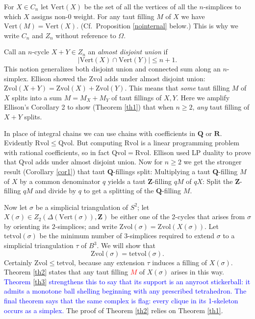 \documentclass[12pt]{article}
\def\ZZ{\mathbf{Z}}
\def\QQ{\mathbf{Q}}
\def\RR{\mathbf{R}}
\newcommand{\kw}{\mathrm}
\newcommand{\vertices}{\kw{Vert}}
\newcommand{\Zvol}{\kw{Zvol}}
\newcommand{\Qvol}{\kw{Qvol}}
\newcommand{\Rvol}{\kw{Rvol}}
\newcommand{\tetvol}{\kw{tetvol}}
\begin{document}
For $X \in C_n$ let
$\vertices(X)$ be the set of all the vertices of all the $n$-simplices
to which $X$ assigns non-$0$ weight.
For any taut filling $M$ of $X$ we have $\vertices(M) = \vertices(X)$.
(Cf.\ Proposition \ref{nointernal} below.)
This is why we write $C_n$ and $Z_n$ without reference to $\Omega$.

Call an $n$-cycle $X+Y \in Z_n$ an \emph{almost disjoint union} if
\[
|\vertices(X) \cap \vertices(Y)| \leq n+1
.
\]
This notion generalizes both disjoint union and connected sum
along an $n$-simplex.
Ellison \cite{ellison:gap}
showed the $\Zvol$ adds under almost disjoint union:
$\Zvol(X+Y) = \Zvol(X) + \Zvol(Y)$.
This means that \emph{some} taut filling $M$ of $X$ splits into a sum
$M=M_X+M_Y$ of taut fillings of $X,Y$.
Here we amplify Ellison's Corollary 2 to show (Theorem \ref{th1})
that when $n \geq 2$, \emph{any} taut filling of $X+Y$ splits.

In place of integral chains we can use chains with
coefficients in $\QQ$ or $\RR$.
Evidently $\Rvol \leq \Qvol$.
But computing $\Rvol$ is
a linear programming problem with rational coefficients,
so in fact $\Qvol = \Rvol$.
Ellison used LP duality to prove that
$\Qvol$ adds under almost
disjoint union.
Now for $n \geq 2$ we get the stronger result
(Corollary \ref{cor1})
that taut $\QQ$-fillings split:
Multiplying a taut
$\QQ$-filling $M$ of $X$ by a common denominator $q$
yields a taut $\ZZ$-filling $qM$ of $qX$:
Split the $\ZZ$-filling $qM$ and divide by $q$ to get a splitting
of the $\QQ$-filling $M$.

Now let $\sigma$ be a simplicial triangulation of $S^2$;
let $X(\sigma) \in Z_2(\Delta(\vertices(\sigma)),\ZZ)$
be either one of the 2-cycles
that arises from $\sigma$ by orienting its $2$-simplices;
and write $\Zvol(\sigma) = \Zvol(X(\sigma))$.
Let $\tetvol(\sigma)$ be the minimum number of $3$-simplices
required to extend $\sigma$ to a simplicial triangulation $\tau$ of $B^3$.
We will show that
\[
\Zvol(\sigma) = \tetvol(\sigma)
.
\]
Certainly $\Zvol \leq \tetvol$,
because any extension $\tau$ induces a filling
of $X(\sigma)$.
Theorem \ref{th2} states that 
any taut filling \textcolor{red}{$M$} of $X(\sigma)$ arises in this way.
\textcolor{blue}{Theorem \ref{th3} strengthens this to say that its support is an anyroot
stickerball: it admits a monotone ball shelling beginning with any prescribed
tetrahedron.  The final theorem says that the same complex is flag: every
clique in its 1-skeleton occurs as a simplex.}
The proof of Theorem \ref{th2} relies on Theorem \ref{th1}.
\end{document}
